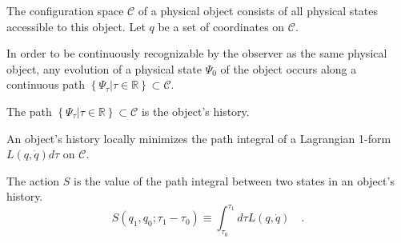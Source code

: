 \begin{definition}
The configuration space $\mathcal{C}$ of a physical object consists of all physical states accessible to this object. Let $q$ be a set of coordinates on $\mathcal{C}$.
\end{definition}
\begin{axiom}
In order to be continuously recognizable by the observer as the same physical object, any evolution of a physical state $\Psi_0$ of the object occurs along a continuous path $\left\{\Psi_\tau\rvert\tau\in\mathbb{R}\right\}\subset\mathcal{C}$.
\end{axiom}
\begin{definition}
The path $\left\{\Psi_\tau\rvert\tau\in\mathbb{R}\right\}\subset\mathcal{C}$ is the object's history.
\end{definition}
\begin{axiom}
An object's history locally minimizes the path integral of a Lagrangian 1-form $L(q,\dot{q})d\tau$ on $\mathcal{C}$.
\end{axiom}
\begin{definition}
The action $S$ is the value of the path integral between two states in an object's history.
\begin{equation}
S(q_1,q_0;\tau_1-\tau_0) \equiv \int_{\tau_0}^{\tau_1}d\tau L(q,\dot{q})\quad.
\end{equation}
\end{definition}
